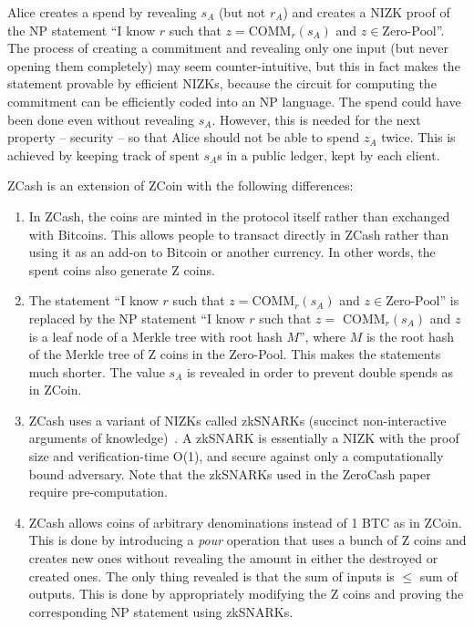 \documentclass[]{report}   %
\begin{document}
Alice creates a spend by revealing $s_A$ (but not $r_A$) and creates a NIZK proof of the NP statement ``I know $r$ such that $z=\text{COMM}_r(s_A)$ and $z \in \text{Zero-Pool}$''. The process of creating a commitment and revealing only one input (but never opening them completely) may seem counter-intuitive, but this in fact makes the statement provable by efficient NIZKs, because the circuit for computing the commitment can be efficiently coded into an NP language. The spend could have been done even without revealing $s_A$. However, this is needed for the next property -- security -- so that Alice should not be able to spend $z_A$ twice. This is achieved by keeping track of spent $s_A$s in a public ledger, kept by each client. 

ZCash is an extension of ZCoin with the following differences:
\begin{enumerate}
	\item In ZCash, the coins are minted in the protocol itself rather than exchanged with Bitcoins. This allows people to transact directly in ZCash rather than using it as an add-on to Bitcoin or another currency. In other words, the spent coins also generate Z coins.
	\item The statement  ``I know $r$ such that $z=\text{COMM}_r(s_A)$ and $z \in \text{Zero-Pool}$'' is replaced by the NP statement  ``I know $r$ such that $z =$ COMM$_r(s_A)$ and $z$ is a leaf node of a Merkle tree with root hash $M$'', where $M$ is the root hash of the Merkle tree of Z coins in the Zero-Pool. This makes the statements much shorter. The value $s_A$ is revealed in order to prevent double spends as in ZCoin.

	\item ZCash uses a variant of NIZKs called zkSNARKs (succinct non-interactive arguments of knowledge)~\cite{cryptoeprint:2013:879,ben2013snarks}. A zkSNARK is essentially a NIZK with the 
	proof size and verification-time O(1), and secure against only a computationally bound adversary. Note that the zkSNARKs used in the ZeroCash paper~\cite{sasson2014zerocash} require pre-computation. %

	\item ZCash allows coins of arbitrary denominations instead of 1 BTC as in ZCoin. This is done by introducing a {\em pour} operation that uses a bunch of Z coins and creates new ones without revealing the amount in either the destroyed or created ones. The only thing revealed is that the sum of inputs is $\leq$ sum of outputs. This is done by appropriately modifying the Z coins and proving the corresponding NP statement using zkSNARKs. \end{enumerate}
\end{document}

